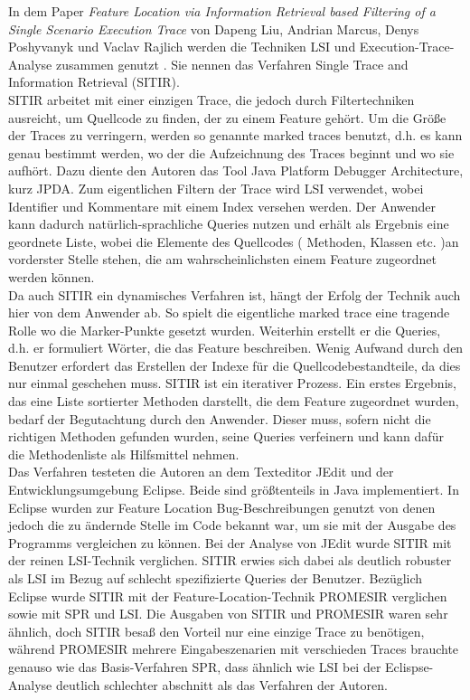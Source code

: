 \documentclass[runningheads,a4paper]{llncs}
\begin{document}
In dem Paper \textit{Feature Location via Information Retrieval based Filtering of a Single Scenario Execution Trace} von Dapeng Liu, Andrian Marcus, Denys Poshyvanyk und Vaclav Rajlich werden die Techniken LSI und Execution-Trace-Analyse zusammen genutzt \cite{DynmicGuided}. Sie nennen das Verfahren Single Trace and Information Retrieval (SITIR).\\
SITIR arbeitet mit einer einzigen Trace, die jedoch durch Filtertechniken ausreicht, um Quellcode zu finden, der zu einem Feature gehört. Um die Größe der Traces zu verringern, werden so genannte marked traces benutzt, d.h. es kann genau bestimmt werden, wo der die Aufzeichnung des Traces beginnt und wo sie aufhört. Dazu diente den Autoren das Tool Java Platform Debugger Architecture, kurz JPDA. Zum eigentlichen Filtern der Trace wird LSI verwendet, wobei Identifier und Kommentare mit einem Index versehen werden. Der Anwender kann dadurch natürlich-sprachliche Queries nutzen und erhält als Ergebnis eine geordnete Liste, wobei die Elemente des Quellcodes ( Methoden, Klassen etc. )an vorderster Stelle stehen, die am wahrscheinlichsten einem Feature zugeordnet werden können.\\
Da auch SITIR ein dynamisches Verfahren ist, hängt der Erfolg der Technik auch hier von dem Anwender ab. So spielt die eigentliche marked trace eine tragende Rolle wo die Marker-Punkte gesetzt wurden. Weiterhin erstellt er die Queries, d.h. er formuliert Wörter, die das Feature beschreiben. Wenig Aufwand durch den Benutzer erfordert das Erstellen der Indexe für die Quellcodebestandteile, da dies nur einmal geschehen muss. SITIR ist ein iterativer Prozess. Ein erstes Ergebnis, das eine Liste sortierter Methoden darstellt, die dem Feature zugeordnet wurden, bedarf der Begutachtung durch den Anwender. Dieser muss, sofern nicht die richtigen Methoden gefunden wurden, seine Queries verfeinern und kann dafür die Methodenliste als Hilfsmittel nehmen.\\
Das Verfahren testeten die Autoren an dem Texteditor JEdit und der Entwicklungsumgebung Eclipse. Beide sind größtenteils in Java implementiert. In Eclipse wurden zur Feature Location Bug-Beschreibungen genutzt von denen jedoch die zu ändernde Stelle im Code bekannt war, um sie mit der Ausgabe des Programms vergleichen zu können. Bei der Analyse von JEdit wurde SITIR mit der reinen LSI-Technik verglichen. SITIR erwies sich dabei als deutlich robuster als LSI im Bezug auf schlecht spezifizierte Queries der Benutzer. Bezüglich Eclipse wurde SITIR mit der Feature-Location-Technik PROMESIR verglichen sowie mit SPR und LSI. Die Ausgaben von SITIR und PROMESIR waren sehr ähnlich, doch SITIR besaß den Vorteil nur eine einzige Trace zu benötigen, während PROMESIR mehrere Eingabeszenarien mit verschieden Traces brauchte genauso wie das Basis-Verfahren SPR, dass ähnlich wie LSI bei der Eclispse-Analyse deutlich schlechter abschnitt als das Verfahren der Autoren.\\
\end{document}
